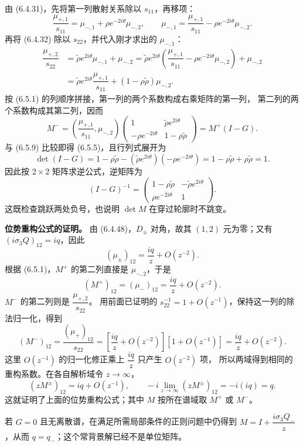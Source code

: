 \documentclass[lang=cn,scheme=chinese,mode=simple,device=normal,color=blue,
math=cm,thmcnt=section,12pt]{elegantbook}
\begin{document}
\begin{callout}[计算：跳跃矩阵的两列及行列式]
    由 (6.4.31)，先将第一列散射关系除以 $s_{11}$，再移项：
    \[
        \dfrac{\mu_{+,1}}{s_{11}}=\mu_{-,1}+\rho e^{-2i\theta}\mu_{-,2},
        \qquad \mu_{-,1}=\dfrac{\mu_{+,1}}{s_{11}}-\rho e^{-2i\theta}\mu_{-,2}.
    \]
    再将 (6.4.32) 除以 $s_{22}$，并代入刚才求出的 $\mu_{-,1}$：
    \[
        \begin{aligned}
            \dfrac{\mu_{+,2}}{s_{22}}
             & =\widetilde\rho e^{2i\theta}\mu_{-,1}+\mu_{-,2}
            =\widetilde\rho e^{2i\theta}\left(\dfrac{\mu_{+,1}}{s_{11}}-\rho e^{-2i\theta}\mu_{-,2}\right)+\mu_{-,2} \\
             & =\widetilde\rho e^{2i\theta}\dfrac{\mu_{+,1}}{s_{11}}+(1-\rho\widetilde\rho)\mu_{-,2}.
        \end{aligned}
    \]
    按 (6.5.1) 的列顺序拼接，第一列的两个系数构成右乘矩阵的第一列，
    第二列的两个系数构成其第二列，因而
    \[
        M^-=\left(\dfrac{\mu_{+,1}}{s_{11}},\mu_{-,2}\right)
        \begin{pmatrix}1&\widetilde\rho e^{2i\theta}\\-\rho e^{-2i\theta}&1-\rho\widetilde\rho\end{pmatrix}
        =M^+(I-G).
    \]
    与 (6.5.9) 比较即得 (6.5.5)，且行列式展开为
    \[
        \det(I-G)=1-\rho\widetilde\rho
        -(\widetilde\rho e^{2i\theta})(-\rho e^{-2i\theta})
        =1-\rho\widetilde\rho+\rho\widetilde\rho=1.
    \]
    因此按 $2\times2$ 矩阵求逆公式，逆矩阵为
    \[
        (I-G)^{-1}=\begin{pmatrix}1-\rho\widetilde\rho & -\widetilde\rho e^{2i\theta} \\
               \rho e^{-2i\theta}   & 1\end{pmatrix}.
    \]
    这既检查跳跃两处负号，也说明 $\det M$ 在穿过轮廓时不跳变。

    \textbf{位势重构公式的证明。}
    由 (6.4.48)，$D_\pm$ 对角，故其 $(1,2)$ 元为零；又有
    $(i\sigma_3Q)_{12}=iq$，因此
    \[
        (\mu_\pm)_{12}=\dfrac{iq}{z}+O(z^{-2}).
    \]
    根据 (6.5.1)，$M^+$ 的第二列直接是 $\mu_{-,2}$，于是
    \[
        (M^+)_{12}=(\mu_-)_{12}=\dfrac{iq}{z}+O(z^{-2}).
    \]
    $M^-$ 的第二列则是 $\dfrac{\mu_{+,2}}{s_{22}}$。
    用前面已证明的 $s_{22}^{-1}=1+O(z^{-1})$，保持这一列的除法归一化，得到
    \[
        (M^-)_{12}=\dfrac{(\mu_+)_{12}}{s_{22}}
        =\left[\dfrac{iq}{z}+O(z^{-2})\right][1+O(z^{-1})]
        =\dfrac{iq}{z}+O(z^{-2}).
    \]
    这里 $O(z^{-1})$ 的归一化修正乘上 $\dfrac{iq}{z}$ 只产生 $O(z^{-2})$ 项，
    所以两域得到相同的重构系数。在各自解析域令 $z\to\infty$，
    \[
        (zM^\pm)_{12}=iq+O(z^{-1}),\qquad
        -i\lim\limits_{z\to\infty}(zM^\pm)_{12}=-i(iq)=q.
    \]
    这就证明了上面的位势重构公式；其中 $M$ 按所在谱域取 $M^+$ 或 $M^-$。

    若 $G=0$ 且无离散谱，在满足所需局部条件的正则问题中仍得到
    $M=I+\dfrac{i\sigma_3Q_-}{z}$，从而 $q=q_-$；这个常背景解已经不是单位矩阵。
\end{callout}
\end{document}
